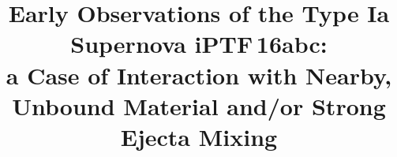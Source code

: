 \documentclass[twocolumn]{aastex61}
\newcommand{\abc}{iPTF\,16abc}
\begin{document}
\title{Early Observations of the Type Ia Supernova \abc:\\
\textbf{a Case of Interaction with Nearby, Unbound Material and/or} Strong Ejecta Mixing}


\end{document}
